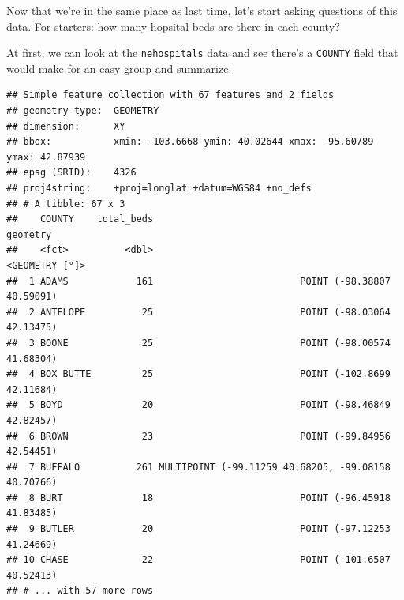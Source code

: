 \documentclass[]{book}
\newenvironment{Shaded}{\begin{snugshade}}{\end{snugshade}}
\newcommand{\DataTypeTok}[1]{\textcolor[rgb]{0.13,0.29,0.53}{#1}}
\newcommand{\KeywordTok}[1]{\textcolor[rgb]{0.13,0.29,0.53}{\textbf{#1}}}
\newcommand{\NormalTok}[1]{#1}
\newcommand{\OperatorTok}[1]{\textcolor[rgb]{0.81,0.36,0.00}{\textbf{#1}}}
\newcommand{\StringTok}[1]{\textcolor[rgb]{0.31,0.60,0.02}{#1}}
\begin{document}
\begin{Shaded}
\end{Shaded}

Now that we're in the same place as last time, let's start asking questions of this data. For starters: how many hopsital beds are there in each county?

At first, we can look at the \texttt{nehospitals} data and see there's a \texttt{COUNTY} field that would make for an easy group and summarize.

\begin{Shaded}
\end{Shaded}

\begin{verbatim}
## Simple feature collection with 67 features and 2 fields
## geometry type:  GEOMETRY
## dimension:      XY
## bbox:           xmin: -103.6668 ymin: 40.02644 xmax: -95.60789 ymax: 42.87939
## epsg (SRID):    4326
## proj4string:    +proj=longlat +datum=WGS84 +no_defs
## # A tibble: 67 x 3
##    COUNTY    total_beds                                            geometry
##    <fct>          <dbl>                                      <GEOMETRY [°]>
##  1 ADAMS            161                          POINT (-98.38807 40.59091)
##  2 ANTELOPE          25                          POINT (-98.03064 42.13475)
##  3 BOONE             25                          POINT (-98.00574 41.68304)
##  4 BOX BUTTE         25                          POINT (-102.8699 42.11684)
##  5 BOYD              20                          POINT (-98.46849 42.82457)
##  6 BROWN             23                          POINT (-99.84956 42.54451)
##  7 BUFFALO          261 MULTIPOINT (-99.11259 40.68205, -99.08158 40.70766)
##  8 BURT              18                          POINT (-96.45918 41.83485)
##  9 BUTLER            20                          POINT (-97.12253 41.24669)
## 10 CHASE             22                          POINT (-101.6507 40.52413)
## # ... with 57 more rows
\end{verbatim}
\end{document}
